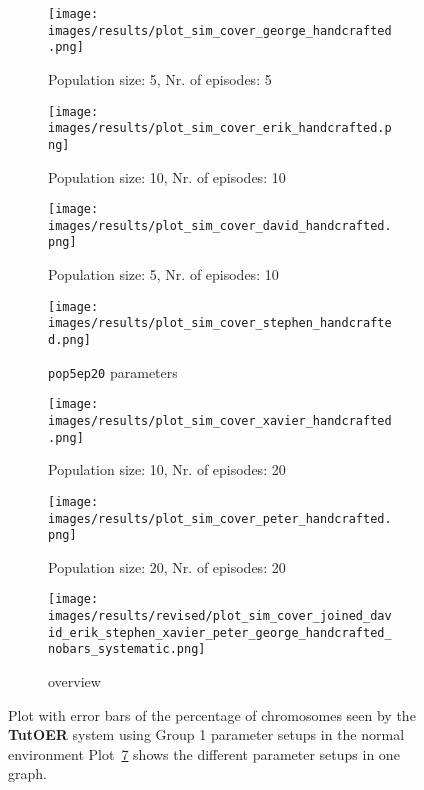 \begin{figure}[ht]
	\begin{subfigure}{0.48\linewidth}
	\texttt{[image: images/results/plot\_sim\_cover\_george\_handcrafted.png]}
	\caption{Population size: 5, Nr. of episodes: 5}
	\label{fig:cover_handcrafted_george}
	\end{subfigure}
	\hfill
	\begin{subfigure}{0.48\linewidth}
	\texttt{[image: images/results/plot\_sim\_cover\_erik\_handcrafted.png]}
	\caption{Population size: 10, Nr. of episodes: 10}
	\label{fig:cover_handcrafted_erik}
	\end{subfigure}
	\begin{subfigure}{0.48\linewidth}
	\texttt{[image: images/results/plot\_sim\_cover\_david\_handcrafted.png]}
	\caption{Population size: 5, Nr. of episodes: 10}
	\label{fig:cover_handcrafted_david}
	\end{subfigure}
	\hfill
	\begin{subfigure}{0.48\linewidth}
	\texttt{[image: images/results/plot\_sim\_cover\_stephen\_handcrafted.png]}
	\caption{\texttt{pop5ep20} parameters}
	\label{fig:cover_handcrafted_stephen}
	\end{subfigure}
	\begin{subfigure}{0.48\linewidth}
	\texttt{[image: images/results/plot\_sim\_cover\_xavier\_handcrafted.png]}
	\caption{Population size: 10, Nr. of episodes: 20}
	\label{fig:cover_handcrafted_xavier}
	\end{subfigure}
	\hfill
	\begin{subfigure}{0.48\linewidth}
	\texttt{[image: images/results/plot\_sim\_cover\_peter\_handcrafted.png]}
	\caption{Population size: 20, Nr. of episodes: 20}
	\label{fig:cover_handcrafted_peter}
	\end{subfigure}
	\begin{subfigure}{\linewidth}
	\texttt{[image: images/results/revised/plot\_sim\_cover\_joined\_david\_erik\_stephen\_xavier\_peter\_george\_handcrafted\_nobars\_systematic.png]}
	\caption{overview}
	\label{fig:cover_handcrafted_overview_group1}
	\end{subfigure}
	\caption[Percentage seen in normal simulated environment for group 1]{Plot with error bars of the percentage of chromosomes seen by the \textbf{TutOER}
	system using Group 1 parameter setups in the normal environment
	Plot~\ref{fig:cover_handcrafted_overview_group1} shows the
	different parameter setups in one graph.}
	\label{fig:cover_handcrafted_container_group1}
\end{figure}


